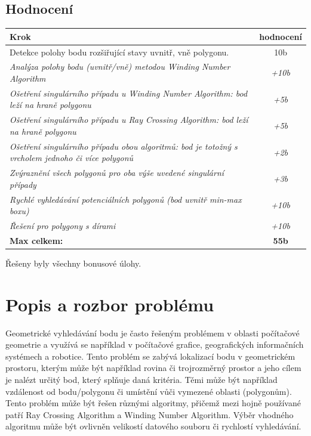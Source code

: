 \documentclass{article}
\begin{document}
\begin{spacing}{1.5}
\subsection*{\textbf{Hodnocení}}
\vspace{0.3cm}
\begin{adjustbox}{width=1\textwidth}
\begin{tabular}{|l|c|}
\hline
\textbf{Krok}                                                                                  & \textbf{hodnocení} \\ \hline
Detekce polohy bodu rozšiřující stavy uvnitř, vně polygonu.                                    &  10b              \\ \hline
\textit{Analýza polohy bodu (uvnitř/vně) metodou Winding Number Algorithm}                    & \textit{+10b}    \\ \hline
\textit{Ošetření singulárního případu u Winding Number Algorithm: bod leží na hraně polygonu} & \textit{+5b}    \\ \hline
\textit{Ošetření singulárního případu u Ray Crossing Algorithm: bod leží na hraně polygonu}   & \textit{+5b}    \\ \hline
\textit{Ošetření singulárního případu obou algoritmů: bod je totožný s vrcholem jednoho či více polygonů} & \textit{+2b} \\ \hline
\textit{Zvýraznění všech polygonů pro oba výše uvedené singulární případy}                    & \textit{+3b}    \\ \hline
\textit{Rychlé vyhledávání potenciálních polygonů (bod uvnitř min-max boxu)}                    & \textit{+10b}    \\ \hline
\textit{Řešení pro polygony s dírami}                    & \textit{+10b}    \\ \hline
\textbf{Max celkem:}                                                                                  & \textbf{55b} \\ \hline
\end{tabular}
\end{adjustbox}

\vspace{1cm}
\noindent Řešeny byly všechny bonusové úlohy.
\newpage

\section{Popis a rozbor problému}
Geometrické vyhledávání bodu je často řešeným problémem v oblasti počítačové geometrie a využívá se například v počítačové grafice, geografických informačních systémech a robotice. Tento problém se zabývá lokalizací bodu v geometrickém prostoru, kterým může být například rovina či trojrozměrný prostor a jeho cílem je nalézt určitý bod, který splňuje daná kritéria. Těmi může být například vzdálenost od bodu/polygonu či umístění vůči vymezené oblasti (polygonům). Tento problém může být řešen různými algoritmy, přičemž mezi hojně používané patří Ray Crossing Algorithm a Winding Number Algorithm. Výběr vhodného algoritmu může být ovlivněn velikostí datového souboru či rychlostí vyhledávání. 


\end{spacing}
\end{document}
